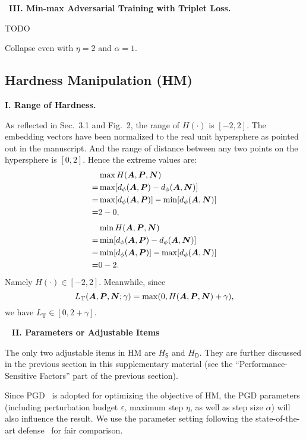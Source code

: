 ~\newline\textbf{III. Min-max Adversarial Training with Triplet Loss.}

TODO

Collapse even with $\eta=2$ and $\alpha=1$.

\subsection{Hardness Manipulation (HM)}
\label{sec:b2}

\noindent\textbf{I. Range of Hardness.}

As reflected in Sec.~3.1 and Fig.~2, the range of $H(\cdot)$ is $[-2, 2]$.
%
The embedding vectors have been normalized to the real unit hypersphere
as pointed out in the manuscript.
%
And the range of distance between any two points on the hypersphere is
$[0,2]$.
%
Hence the extreme values are:
%
\begin{align}
	& \max H({\bm{A}}, {\bm{P}}, {\bm{N}})\\
	=& \max [d_\phi({\bm{A}}, {\bm{P}}) - d_\phi({\bm{A}}, {\bm{N}})]\\
	=& \max [d_\phi({\bm{A}}, {\bm{P}})] - \min [d_\phi({\bm{A}}, {\bm{N}})]\\
	=& 2 - 0,
\end{align}
%
\begin{align}
	& \min H({\bm{A}}, {\bm{P}}, {\bm{N}})\\
	=& \min [d_\phi({\bm{A}}, {\bm{P}}) - d_\phi({\bm{A}}, {\bm{N}})]\\
	=& \min [d_\phi({\bm{A}}, {\bm{P}})] - \max [d_\phi({\bm{A}}, {\bm{N}})]\\
	=& 0 - 2.
\end{align}
%
Namely $H(\cdot)\in[-2,2]$. Meanwhile, since
%
\begin{equation}
%
L_\text{T}(\mA, \mP, \mN; \gamma) = \max(0, H(\mA, \mP, \mN) + \gamma),
%
\end{equation}
%
we have $L_\text{T}\in[0, 2+\gamma]$.

~\newline
\noindent\textbf{II. Parameters or Adjustable Items}

The only two adjustable items in HM are $H_\mathsf{S}$ and $H_\mathsf{D}$.
%
They are further discussed in the previous section in this supplementary
material (see the ``Performance-Sensitive Factors'' part of the previous
section).

Since PGD~\cite{madry} is adopted for optimizing the objective of HM, the
PGD parameters (including perturbation budget $\varepsilon$, maximum step
$\eta$, as well as step size $\alpha$) will also influence the result.
%
We use the parameter setting following the state-of-the-art
defense~\cite{robrank} for fair comparison.

